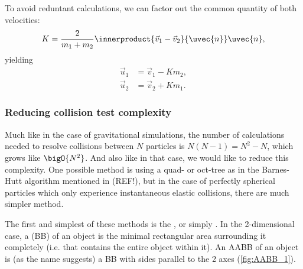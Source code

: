 To avoid reduntant calculations, we can factor out the common quantity of both velocities:
\begin{equation}
	K = \frac{2}{m_{1}+m_{2}}\innerproduct{\vec{v}_{1}-\vec{v}_{2}}{\uvec{n}}\uvec{n},
	\label{eq:elastic_collision_common_quantity}
\end{equation}
yielding
\begin{equation}
	\begin{aligned}
		\vec{u}_{1} & = \vec{v}_{1}-Km_{2}, \\
		\vec{u}_{2} & = \vec{v}_{2}+Km_{1}.
	\end{aligned}
	\label{eq:elastic_collision_final_equation}
\end{equation}

\subsubsection{Reducing collision test complexity}
Much like in the case of gravitational simulations, the number of calculations needed to resolve collisions between $N$ particles is $N(N-1)=N^{2}-N$, which grows like $\bigO{N^{2}}$. And also like in that case, we would like to reduce this complexity. One possible method is using a quad- or oct-tree as in the Barnes-Hutt algorithm mentioned in (REF!), but in the case of perfectly spherical particles which only experience instantaneous elastic collisions, there are much simpler method.

The first and simplest of these methods is the , or simply . In the 2-dimensional case, a  (BB) of an object is the minimal rectangular area surrounding it completely (i.e. that contains the entire object within it). An AABB of an object is (as the name suggests) a BB with sides parallel to the 2 axes (\autoref{fig:AABB_1}).

